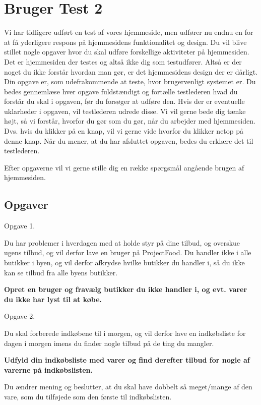 \chapter{Bruger Test 2}\label{b:brugertest2}

Vi har tidligere udført en test af vores hjemmeside, men udfører nu endnu en for at få yderligere respons på hjemmesidens funktionalitet og design.
Du vil blive stillet nogle opgaver hvor du skal udføre forskellige aktiviteter på hjemmesiden.
Det er hjemmesiden der testes og altså ikke dig som testudfører.
Altså er der noget du ikke forstår hvordan man gør, er det hjemmesidens design der er dårligt.
Din opgave er, som udefrakommende at teste, hvor brugervenligt systemet er. 
Du bedes gennemlæse hver opgave fuldstændigt og fortælle testlederen hvad du forstår du skal i opgaven, før du forsøger at udføre den.
Hvis der er eventuelle uklarheder i opgaven, vil testlederen udrede disse.
Vi vil gerne bede dig tænke højt, så vi forstår, hvorfor du gør som du gør, når du arbejder med hjemmesiden.
Dvs. hvis du klikker på en knap, vil vi gerne vide hvorfor du klikker netop på denne knap.
Når du mener, at du har afsluttet opgaven, bedes du erklære det til testlederen.

Efter opgaverne vil vi gerne stille dig en række spørgsmål angående brugen af hjemmesiden.

\section{Opgaver}

Opgave 1.

Du har problemer i hverdagen med at holde styr på dine tilbud, og overskue ugens tilbud, og vil derfor lave en bruger på ProjectFood.
Du handler ikke i alle butikker i byen, og vil derfor afkrydse hvilke butikker du handler i, så du ikke kan se tilbud fra alle byens butikker.

\textbf{Opret en bruger og fravælg butikker du ikke handler i, og evt. varer du ikke har lyst til at købe. }

Opgave 2.

Du skal forberede indkøbene til i morgen, og vil derfor lave en indkøbsliste for dagen i morgen imens du finder nogle tilbud på de ting du mangler.

\textbf{Udfyld din indkøbsliste med varer og find derefter tilbud for nogle af varerne på indkøbslisten.}

Du ændrer mening og beslutter, at du skal have dobbelt så meget/mange af den vare, som du tilføjede som den første til indkøbslisten.

